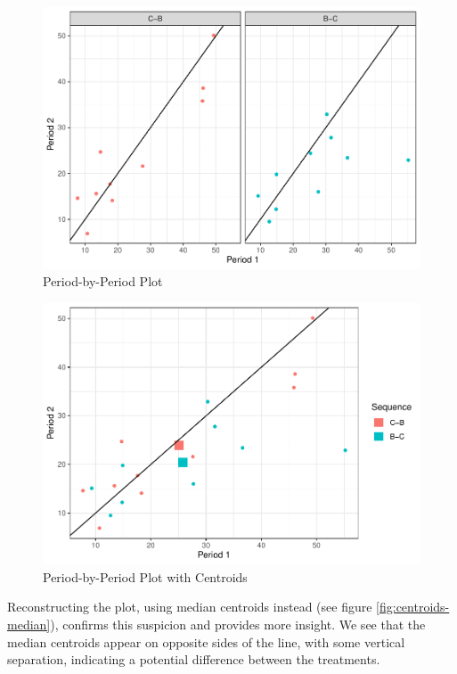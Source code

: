 \begin{figure}
\centering
\includegraphics{ch4_files/figure-latex/period-by-period-1.pdf}
\caption{Period-by-Period Plot}
\end{figure}

\begin{figure}
\centering
\includegraphics{ch4_files/figure-latex/centroids-1.pdf}
\caption{Period-by-Period Plot with Centroids}
\end{figure}

Reconstructing the plot, using median centroids instead (see figure
\ref{fig:centroids-median}), confirms this suspicion and provides more
insight. We see that the median centroids appear on opposite sides of
the line, with some vertical separation, indicating a potential
difference between the treatments.


